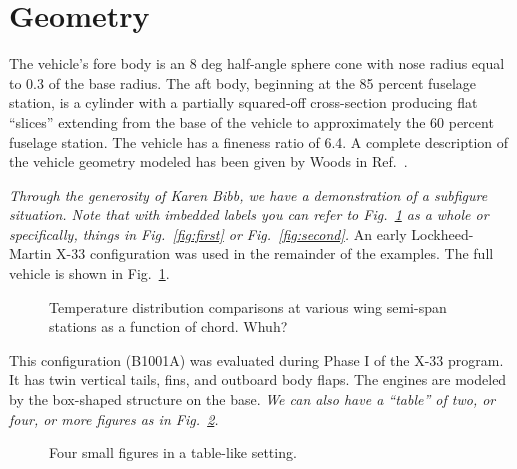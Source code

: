 \documentclass[cover]{aiaa}%
\begin{document}
\section{Geometry}

The vehicle's fore body is an 8 deg half-angle sphere cone with
nose radius equal to 0.3 of the base radius.  The aft body,
beginning at the 85 percent fuselage station, is a cylinder with
a partially squared-off cross-section producing flat ``slices''
extending from the base of the vehicle to approximately the 60
percent fuselage station.  The vehicle has a fineness ratio of
6.4.  A complete description of the vehicle geometry modeled has
been given by Woods in Ref.~.

{\em Through the generosity of Karen Bibb, we have a
demonstration of a subfigure situation.  Note that with imbedded
labels you can refer to Fig.~\ref{fig:both} as a whole or
specifically, things in Fig.~\ref{fig:first} or
Fig.~\ref{fig:second}.}  An early Lockheed-Martin X-33
configuration was used in the remainder of the examples.  The
full vehicle is shown in Fig.~\ref{fig:both}.
\begin{figure}
  \begin{subfigmatrix}{1}
  \end{subfigmatrix}
  \caption{Temperature distribution comparisons at various wing
           semi-span stations as a function of chord.  Whuh?}
  \label{fig:both}
\end{figure}
This configuration (B1001A) was evaluated during
Phase I of the X-33 program.  It has twin vertical tails, fins,
and outboard body flaps.  The engines are modeled by the box-shaped
structure on the base.  {\em We can also have a ``table'' of two,
or four, or more figures as in Fig.~\ref{fig:four}.}
\begin{figure}
  \begin{subfigmatrix}{2}
 \end{subfigmatrix}
  \caption{Four small figures in a table-like setting.}
  \label{fig:four}
\end{figure}
\end{document}
